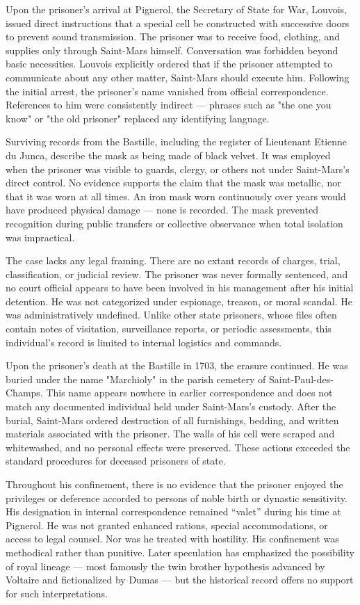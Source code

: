 Upon the prisoner's arrival at Pignerol, the Secretary of State for War, Louvois, issued direct instructions that a special cell be constructed with successive doors to prevent sound transmission. The prisoner was to receive food, clothing, and supplies only through Saint-Mars himself. Conversation was forbidden beyond basic necessities. Louvois explicitly ordered that if the prisoner attempted to communicate about any other matter, Saint-Mars should execute him. Following the initial arrest, the prisoner's name vanished from official correspondence. References to him were consistently indirect — phrases such as "the one you know" or "the old prisoner" replaced any identifying language.

Surviving records from the Bastille, including the register of Lieutenant Etienne du Junca, describe the mask as being made of black velvet. It was employed when the prisoner was visible to guards, clergy, or others not under Saint-Mars's direct control. No evidence supports the claim that the mask was metallic, nor that it was worn at all times. An iron mask worn continuously over years would have produced physical damage — none is recorded. The mask prevented recognition during public transfers or collective observance when total isolation was impractical.

The case lacks any legal framing. There are no extant records of charges, trial, classification, or judicial review. The prisoner was never formally sentenced, and no court official appears to have been involved in his management after his initial detention. He was not categorized under espionage, treason, or moral scandal. He was administratively undefined. Unlike other state prisoners, whose files often contain notes of visitation, surveillance reports, or periodic assessments, this individual's record is limited to internal logistics and commands.

Upon the prisoner's death at the Bastille in 1703, the erasure continued. He was buried under the name "Marchioly" in the parish cemetery of Saint-Paul-des-Champs. This name appears nowhere in earlier correspondence and does not match any documented individual held under Saint-Mars's custody. After the burial, Saint-Mars ordered destruction of all furnishings, bedding, and written materials associated with the prisoner. The walls of his cell were scraped and whitewashed, and no personal effects were preserved. These actions exceeded the standard procedures for deceased prisoners of state. 

Throughout his confinement, there is no evidence that the prisoner enjoyed the privileges or deference accorded to persons of noble birth or dynastic sensitivity. His designation in internal correspondence remained “valet” during his time at Pignerol. He was not granted enhanced rations, special accommodations, or access to legal counsel. Nor was he treated with hostility. His confinement was methodical rather than punitive. Later speculation has emphasized the possibility of royal lineage — most famously the twin brother hypothesis advanced by Voltaire and fictionalized by Dumas — but the historical record offers no support for such interpretations.

